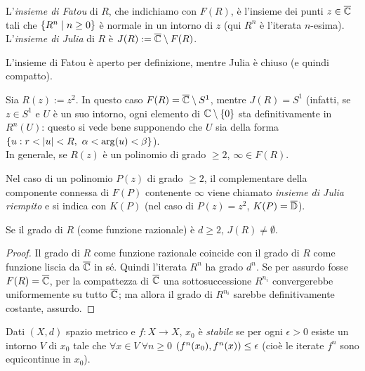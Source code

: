 \begin{defi}L'\emph{insieme di Fatou} di $R$, che indichiamo con $F(R)$, è
l'insieme dei punti $z\in\overline{\mathbb{C}}$ tali che $\left\{R^n\mid n\ge 0\right\}$ è normale in un intorno di $z$
(qui $R^n$ è l'iterata $n$-esima). L'\emph{insieme di Julia} di $R$ è $J(R):=\overline{\mathbb{C}}\setminus F(R)$.
\end{defi}

\begin{oss}L'insieme di Fatou è aperto per definizione, mentre Julia è chiuso (e quindi compatto).
\end{oss}

\begin{esempio}Sia $R(z):=z^2$. In questo caso $F(R)=\overline{\mathbb{C}}\setminus S^1$, mentre $J(R)=S^1$
(infatti, se $z\in S^1$ e $U$ è un suo intorno, ogni elemento di $\mathbb{C}\setminus\left\{0\right\}$ sta definitivamente in $R^n(U)$:
questo si vede bene supponendo che $U$ sia della forma $\set{u:r<\abs{u}<R,\ \alpha<\arg(u)<\beta}$). \\
In generale, se $R(z)$ è un polinomio di grado $\ge 2$, $\infty\in F(R)$.
\end{esempio}

Nel caso di un polinomio $P(z)$ di grado $\ge 2$, il complementare della componente connessa di $F(P)$ contenente $\infty$
viene chiamato \emph{insieme di Julia riempito} e si indica con $K(P)$ (nel caso di $P(z)=z^2$, $K(P)=\overline{\mathbb{D}}$).

\begin{prop}Se il grado di $R$ (come funzione razionale) è $d\ge 2$, $J(R)\neq\emptyset$.
\end{prop}

\begin{proof}Il grado di $R$ come funzione razionale coincide con il grado di $R$ come funzione liscia da $\overline{\mathbb{C}}$ in sé.
Quindi l'iterata $R^n$ ha grado $d^n$. Se per assurdo fosse $F(R)=\overline{\mathbb{C}}$, per la compattezza di $\overline{\mathbb{C}}$
una sottosuccessione $R^{n_i}$ convergerebbe uniformemente su tutto $\overline{\mathbb{C}}$; ma allora il grado
di $R^{n_i}$ sarebbe definitivamente costante, assurdo.
\end{proof}

\begin{defi}Dati $(X,d)$ spazio metrico e $f:X\to X$, $x_0$ è \emph{stabile}
se per ogni $\epsilon>0$ esiste un intorno $V$ di $x_0$ tale che $\forall x\in V\ \forall n\ge 0$
$\left(f^n(x_0),f^n(x)\right)\le\epsilon$ (cioè le iterate $f^n$ sono equicontinue in $x_0$).
\end{defi}

